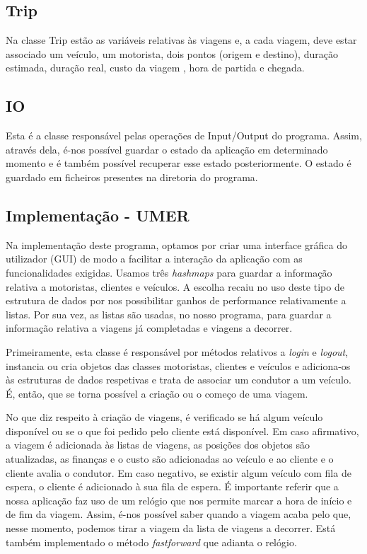 \documentclass[a4paper]{article}
\begin{document}
\subsection{Trip}
Na classe Trip estão as variáveis relativas às viagens e, a cada viagem, deve estar associado um veículo, um motorista, dois pontos (origem e destino), duração estimada, duração real, custo da viagem , hora de partida e chegada.

\subsection{IO}
Esta é a classe responsável pelas operações de Input/Output do programa. Assim, através dela, é-nos possível guardar o estado da aplicação em determinado momento e é também possível recuperar esse estado posteriormente. O estado é guardado em ficheiros presentes na diretoria do programa.

\subsection{Implementação - UMER}

Na implementação deste programa, optamos por criar uma interface gráfica do utilizador (GUI) de modo a facilitar a interação da aplicação com as funcionalidades exigidas. Usamos três \textit{hashmaps} para guardar a informação relativa a motoristas, clientes e veículos. A escolha recaiu no uso deste tipo de estrutura de dados por nos possibilitar ganhos de performance relativamente a listas.
Por sua vez, as listas são usadas, no nosso programa, para guardar a informação relativa a viagens já completadas e viagens a decorrer.

Primeiramente, esta classe é responsável por métodos relativos a \textit{login} e \textit{logout}, instancia ou cria objetos das classes motoristas, clientes e veículos e adiciona-os às estruturas de dados respetivas e trata de associar um condutor a um veículo.
É, então, que se torna possível a criação ou o começo de uma viagem.

No que diz respeito à criação de viagens, é verificado se há algum veículo disponível ou se o que foi pedido pelo cliente está disponível. Em caso afirmativo, a viagem é adicionada às listas de viagens, as posições dos objetos são atualizadas, as finanças e o custo são adicionadas ao veículo e ao cliente e o cliente avalia o condutor. Em caso negativo, se existir algum veículo com fila de espera, o cliente é adicionado à sua fila de espera.
É importante referir que a nossa aplicação faz uso de um relógio que nos permite marcar a hora de início e de fim da viagem. Assim, é-nos possível saber quando a viagem acaba pelo que, nesse momento, podemos tirar a viagem da lista de viagens a decorrer. Está também implementado o método \textit{fastforward} que adianta o relógio.
\end{document}
